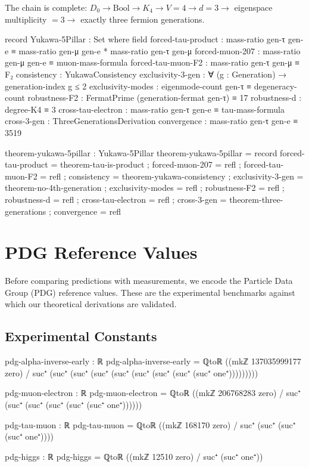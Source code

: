 \documentclass[11pt,a4paper]{book}
\begin{document}
The chain is complete: $D_0 \to \text{Bool} \to K_4 \to V = 4 \to d = 3 \to $ 
eigenspace multiplicity $= 3 \to$ exactly three fermion generations.

\begin{code}
record Yukawa-5Pillar : Set where
  field
    forced-tau-product   : mass-ratio gen-τ gen-e ≡ mass-ratio gen-μ gen-e * mass-ratio gen-τ gen-μ
    forced-muon-207      : mass-ratio gen-μ gen-e ≡ muon-mass-formula
    forced-tau-muon-F2   : mass-ratio gen-τ gen-μ ≡ F₂
    consistency          : YukawaConsistency
    exclusivity-3-gen    : ∀ (g : Generation) → generation-index g ≤ 2
    exclusivity-modes    : eigenmode-count gen-τ ≡ degeneracy-count
    robustness-F2        : FermatPrime (generation-fermat gen-τ) ≡ 17
    robustness-d         : degree-K4 ≡ 3
    cross-tau-electron   : mass-ratio gen-τ gen-e ≡ tau-mass-formula
    cross-3-gen          : ThreeGenerationsDerivation
    convergence          : mass-ratio gen-τ gen-e ≡ 3519

theorem-yukawa-5pillar : Yukawa-5Pillar
theorem-yukawa-5pillar = record
  { forced-tau-product   = theorem-tau-is-product
  ; forced-muon-207      = refl
  ; forced-tau-muon-F2   = refl
  ; consistency          = theorem-yukawa-consistency
  ; exclusivity-3-gen    = theorem-no-4th-generation
  ; exclusivity-modes    = refl
  ; robustness-F2        = refl
  ; robustness-d         = refl
  ; cross-tau-electron   = refl
  ; cross-3-gen          = theorem-three-generations
  ; convergence          = refl
  }
\end{code}

\chapter{PDG Reference Values}
\label{chap:pdg-values}

Before comparing predictions with measurements, we encode the Particle Data Group (PDG) 
reference values. These are the experimental benchmarks against which our theoretical derivations 
are validated.

\section{Experimental Constants}

\begin{code}
pdg-alpha-inverse-early : ℝ
pdg-alpha-inverse-early = ℚtoℝ ((mkℤ 137035999177 zero) / suc⁺ (suc⁺ (suc⁺ (suc⁺ (suc⁺ (suc⁺ (suc⁺ (suc⁺ (suc⁺ one⁺)))))))))

pdg-muon-electron : ℝ
pdg-muon-electron = ℚtoℝ ((mkℤ 206768283 zero) / suc⁺ (suc⁺ (suc⁺ (suc⁺ (suc⁺ (suc⁺ one⁺))))))

pdg-tau-muon : ℝ
pdg-tau-muon = ℚtoℝ ((mkℤ 168170 zero) / suc⁺ (suc⁺ (suc⁺ (suc⁺ one⁺))))

pdg-higgs : ℝ
pdg-higgs = ℚtoℝ ((mkℤ 12510 zero) / suc⁺ (suc⁺ one⁺))
\end{code}
\end{document}
